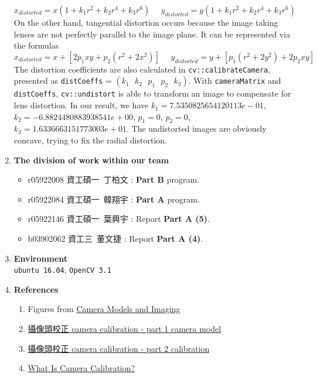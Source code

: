 \documentclass[12pt, a4paper]{article}
\begin{document}
\begin{enumerate}
$\displaystyle x_{distorted} = x(1+k_1r^2+k_2r^4+k_3r^6)\mbox{ }\mbox{ }y_{distorted}=y(1+k_1r^2+k_2r^4+k_3r^6)$ \\
On the other hand, tangential distortion occurs because the image taking lenses are not perfectly parallel to the image plane. It can be represented via the formulas \\
$\displaystyle x_{distorted}=x+[2p_1xy+p_2(r^2+2x^2)]\mbox{ }\mbox{ }y_{distorted}=y+[p_1(r^2+2y^2)+2p_2xy]$ \\
The distortion coefficients are also calculated in \texttt{cv::calibrateCamera}, presented as 
\texttt{distCoeffs} = $\displaystyle (k_1\mbox{ }k_2\mbox{ }p_1\mbox{ }p_2\mbox{ }k_3)$. 
With \texttt{cameraMatrix} and \texttt{distCoeffs}, \texttt{cv::undistort} is able to transform an image to compensate for lens distortion.
In our result, we have $k_1 = 7.5350825654120113e-01$, $k_2 = -6.8824480883938541e+00$, $p_1 = 0$, $p_2 = 0$, $k_3 = 1.6336663151773003e+01$. The undistorted images are obviously concave, trying to fix the radial distortion.
\item \textbf{The division of work within our team}
\begin{itemize}
\item r05922008 資工碩一\mbox{ }丁柏文 : \textbf{Part B} program.
\item r05922084 資工碩一\mbox{ }韓翔宇 : \textbf{Part A} program.
\item r05922146 資工碩一\mbox{ }葉興宇 : Report \textbf{Part A (5)}.
\item b03902062 資工三\mbox{ }董文捷 : Report \textbf{Part A (4)}.
\end{itemize}

\item \textbf{Environment} \\
\texttt{ubuntu 16.04}, \texttt{OpenCV 3.1} 
\item \textbf{References} 
\begin{enumerate}[(1)]
\item Figures from \href{https://www.comp.nus.edu.sg/~cs4243/lecture/camera.pdf}{Camera Models and Imaging} 
\item \href{http://wycwang.blogspot.tw/2012/09/camera-calibration-part-1-camera-model.html}{攝像頭校正 camera calibration - part 1 camera model}
\item \href{http://wycwang.blogspot.tw/2012/10/camera-calibration-part-2-calibration.html}{攝像頭校正 camera calibration - part 2 calibration}
\item \href{https://www.mathworks.com/help/vision/ug/camera-calibration.html?requestedDomain=www.mathworks.com}{What Is Camera Calibration?}
\end{enumerate}

\end{enumerate}
\end{document}
